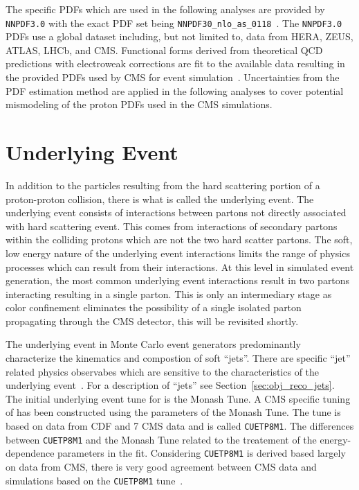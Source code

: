 The specific PDFs which are used in the
following analyses are provided by \texttt{NNPDF3.0} with the exact PDF set being 
\texttt{NNPDF30\_nlo\_as\_0118}~\cite{Ball:2014uwa, Ball:2011uy}. The \texttt{NNPDF3.0} PDFs
use a global dataset including, but not limited to, data from HERA, ZEUS, ATLAS, LHCb, and CMS.
Functional forms derived from theoretical QCD predictions with electroweak corrections are fit
to the available data resulting in the provided PDFs used by CMS for event simulation~\cite{Ball:2014uwa}.
Uncertainties from the PDF estimation method are applied in the following analyses to cover
potential mismodeling of the proton PDFs used in the CMS simulations.



\section{Underlying Event}
In addition to the particles resulting from the hard scattering portion of a proton-proton collision,
there is what is called the underlying event. The underlying event consists of interactions between
partons not directly associated with hard scattering event. This comes from interactions of 
secondary partons within the colliding protons which are not the two hard scatter partons.
The soft, low energy nature of the underlying event interactions limits the range of physics
processes which can result from their interactions. At this level in simulated event generation,
the most common underlying event interactions result in two partons interacting resulting in a 
single parton. This is only an intermediary stage as color confinement eliminates the possibility
of a single isolated parton propagating through the CMS detector, this will be revisited shortly.

The underlying event in 
Monte Carlo event generators predominantly characterize the kinematics and compostion of soft ``jets''.
There are specific ``jet'' related physics observabes which are sensitive to the characteristics of the underlying
event~\cite{Khachatryan:2015pea, Field:cdf2008}. For a description of ``jets'' see Section~\ref{sec:obj_reco_jets}.
The initial underlying event tune for  is the Monash Tune. A CMS specific tuning of 
 has been constructed using the parameters of the Monash Tune. The tune is based
on data from CDF and 7 \TeV CMS data and is called \texttt{CUETP8M1}. The differences between
\texttt{CUETP8M1} and the Monash Tune related to the treatement of the energy-dependence 
parameters in the fit. Considering \texttt{CUETP8M1} is derived based largely on data from
CMS, there is very good agreement between CMS data and simulations based on the
\texttt{CUETP8M1} tune~\cite{Khachatryan:2015pea}. 



